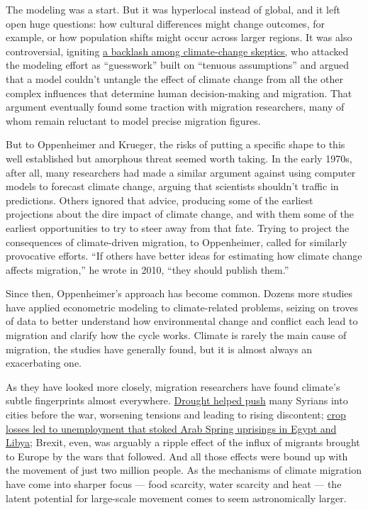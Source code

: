 The modeling was a start. But it was hyperlocal instead of global, and
it left open huge questions: how cultural differences might change
outcomes, for example, or how population shifts might occur across
larger regions. It was also controversial, igniting
\href{http://rogerpielkejr.blogspot.com/2010/07/silly-science.html}{a
backlash among climate-change skeptics,} who attacked the modeling
effort as ``guesswork'' built on ``tenuous assumptions'' and argued that
a model couldn't untangle the effect of climate change from all the
other complex influences that determine human decision-making and
migration. That argument eventually found some traction with migration
researchers, many of whom remain reluctant to model precise migration
figures.

But to Oppenheimer and Krueger, the risks of putting a specific shape to
this well established but amorphous threat seemed worth taking. In the
early 1970s, after all, many researchers had made a similar argument
against using computer models to forecast climate change, arguing that
scientists shouldn't traffic in predictions. Others ignored that advice,
producing some of the earliest projections about the dire impact of
climate change, and with them some of the earliest opportunities to try
to steer away from that fate. Trying to project the consequences of
climate-driven migration, to Oppenheimer, called for similarly
provocative efforts. ``If others have better ideas for estimating how
climate change affects migration,'' he wrote in 2010, ``they should
publish them.''

Since then, Oppenheimer's approach has become common. Dozens more
studies have applied econometric modeling to climate-related problems,
seizing on troves of data to better understand how environmental change
and conflict each lead to migration and clarify how the cycle works.
Climate is rarely the main cause of migration, the studies have
generally found, but it is almost always an exacerbating one.

As they have looked more closely, migration researchers have found
climate's subtle fingerprints almost everywhere.
\href{https://www.pnas.org/content/early/2015/02/23/1421533112.abstract}{Drought
helped push} many Syrians into cities before the war, worsening tensions
and leading to rising discontent;
\href{https://www.americanprogress.org/issues/security/reports/2013/02/28/54579/the-arab-spring-and-climate-change/}{crop
losses led to unemployment that stoked Arab Spring uprisings in Egypt
and Libya}; Brexit, even, was arguably a ripple effect of the influx of
migrants brought to Europe by the wars that followed. And all those
effects were bound up with the movement of just two million people. As
the mechanisms of climate migration have come into sharper focus ---
food scarcity, water scarcity and heat --- the latent potential for
large-scale movement comes to seem astronomically larger.

